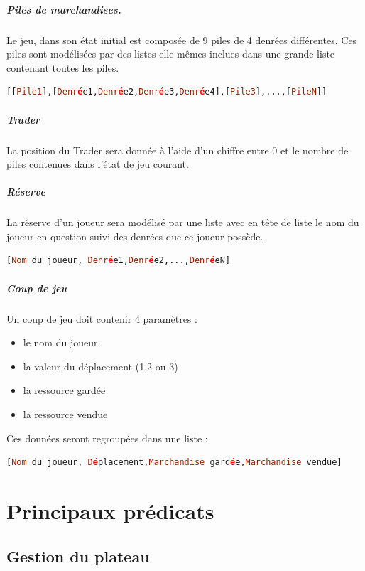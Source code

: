\documentclass[a4paper, 11pt,twoside, leqno]{report}
\theoremstyle{plain}
\begin{document}
\paragraph{Piles de marchandises.} Le jeu, dans son état initial est composée de 9 piles de 4 denrées différentes. Ces piles sont modélisées par des listes elle-mêmes inclues dans une grande liste contenant toutes les piles.
\begin{lstlisting}[language=prolog]
[[Pile1],[Denrée1,Denrée2,Denrée3,Denrée4],[Pile3],...,[PileN]]
\end{lstlisting}
\paragraph{Trader} La position du Trader sera donnée à l'aide d'un chiffre entre 0 et le nombre de piles contenues dans l'état de jeu courant. 
\paragraph{Réserve}La réserve d'un joueur sera modélisé par une liste avec en tête de liste le nom du joueur en question suivi des denrées que ce joueur possède.
\begin{lstlisting}[language=prolog]
[Nom du joueur, Denrée1,Denrée2,...,DenréeN]
\end{lstlisting}
\paragraph{Coup de jeu}Un coup de jeu doit contenir 4 paramètres : 
\begin{itemize}
	\item le nom du joueur
    \item la valeur du déplacement (1,2 ou 3)
    \item la ressource gardée
    \item la ressource vendue
\end{itemize}
Ces données seront regroupées dans une liste : 
\begin{lstlisting}[language=prolog]
[Nom du joueur, Déplacement,Marchandise gardée,Marchandise vendue]
\end{lstlisting}

\chapter{Principaux prédicats}
\section{Gestion du plateau}
\end{document}

